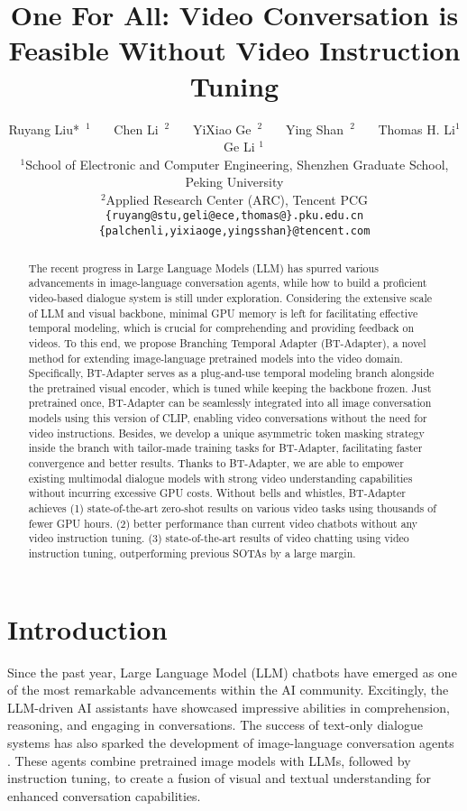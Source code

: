 \documentclass{article} \usepackage{iclr2024_conference,times}
\title{One For All: Video Conversation is Feasible Without Video Instruction Tuning}
\author{{Ruyang Liu*}~$^{1}$
    ~~~{Chen Li}~$^{2}$
    ~~~{YiXiao Ge}~$^{2}$
    ~~~{Ying Shan}~$^{2}$
    ~~~Thomas H. Li$^{1}$ 
    ~~~{Ge Li \footnotesize{\Envelope}}$^{1}$\\
    {\small $^1$School of Electronic and Computer Engineering, Shenzhen Graduate School, Peking University} \\ 
    {\small $^2$Applied Research Center (ARC), Tencent PCG}\\ 
    {\tt\small \{ruyang@stu,geli@ece,thomas@\}.pku.edu.cn}\\
    {\tt\small\{palchenli,yixiaoge,yingsshan\}@tencent.com}\\  
}
\begin{document}
\maketitle

\begin{abstract}
The recent progress in Large Language Models (LLM) has spurred various advancements in image-language conversation agents, 
while how to build a proficient video-based dialogue system is still under exploration. 
Considering the extensive scale of LLM and visual backbone, minimal GPU memory is left for facilitating effective temporal modeling, which is crucial for comprehending and providing feedback on videos. 
To this end, we propose Branching Temporal Adapter (BT-Adapter), a novel method for extending image-language pretrained models into the video domain. Specifically, BT-Adapter serves as a plug-and-use temporal modeling branch alongside the pretrained visual encoder, which is tuned while keeping the backbone frozen. 
Just pretrained once, BT-Adapter can be seamlessly integrated into all image conversation models using this version of CLIP, enabling video conversations without the need for video instructions.
Besides, we develop a unique asymmetric token masking strategy inside the branch with tailor-made training tasks for BT-Adapter, facilitating faster convergence and better results.
Thanks to BT-Adapter, we are able to empower existing multimodal dialogue models with strong video understanding capabilities without incurring excessive GPU costs.
Without bells and whistles, BT-Adapter achieves (1) state-of-the-art zero-shot results on various video tasks using thousands of fewer GPU hours. (2) better performance than current video chatbots without any video instruction tuning. (3) state-of-the-art results of video chatting using video instruction tuning, outperforming previous SOTAs by a large margin.
\end{abstract}

\vspace{-0.8em}

\section{Introduction} \label{intro}
\renewcommand{\thefootnote}{ } 


Since the past year, Large Language Model (LLM) chatbots \citep{touvron2023llama, wang2022self, ouyang2022training, zeng2022glm} have emerged as one of the most remarkable advancements within the AI community. Excitingly, the LLM-driven AI assistants have showcased impressive abilities in comprehension, reasoning, and engaging in conversations. 
The success of text-only dialogue systems has also sparked the development of image-language conversation agents \citep{liu2023visual, dai2023instructblip, zhu2023minigpt, gao2023llama}. These agents combine pretrained image models with LLMs, followed by instruction tuning, to create a fusion of visual and textual understanding for enhanced conversation capabilities.
\end{document}
